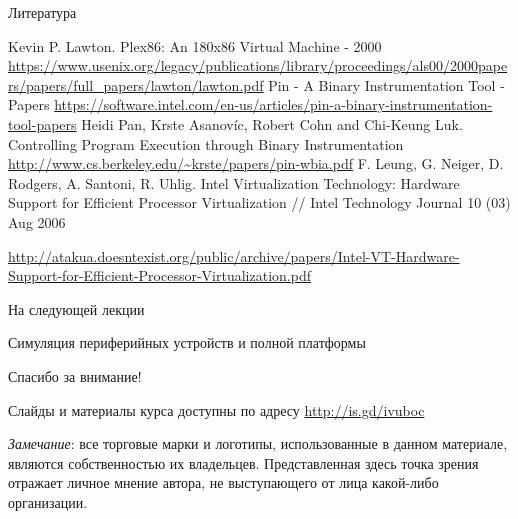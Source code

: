 \documentclass{beamer}
\begin{document}
\begin{frame}[allowframebreaks]{Литература}
\begin{thebibliography}{99}
     Kevin P. Lawton. Plex86: An 180x86 Virtual Machine - 2000 \url{https://www.usenix.org/legacy/publications/library/proceedings/als00/2000papers/papers/full_papers/lawton/lawton.pdf}
     Pin - A Binary Instrumentation Tool - Papers \url{https://software.intel.com/en-us/articles/pin-a-binary-instrumentation-tool-papers}
     Heidi Pan, Krste Asanovíc, Robert Cohn and Chi-Keung Luk. Controlling Program Execution through Binary Instrumentation \url{http://www.cs.berkeley.edu/~krste/papers/pin-wbia.pdf}
     F. Leung, G. Neiger, D. Rodgers, A. Santoni, R. Uhlig. Intel Virtualization Technology: Hardware Support for Efficient Processor Virtualization // Intel Technology Journal 10 (03) Aug 2006

    {\scriptsize\url{http://atakua.doesntexist.org/public/archive/papers/Intel-VT-Hardware-Support-for-Efficient-Processor-Virtualization.pdf}}
\end{thebibliography}
\end{frame}


\begin{frame}{На следующей лекции}
\centering

Симуляция периферийных устройств и полной платформы

\end{frame}

\begin{frame}

{\huge{Спасибо за внимание!}\par}

\vfill

Слайды и материалы курса доступны по адресу \url{http://is.gd/ivuboc} %

\vfill

\tiny{\textit{Замечание}: все торговые марки и логотипы, использованные в данном материале, являются собственностью их владельцев. Представленная здесь точка зрения отражает личное мнение автора, не выступающего от лица какой-либо организации.}

\end{frame}
\end{document}
